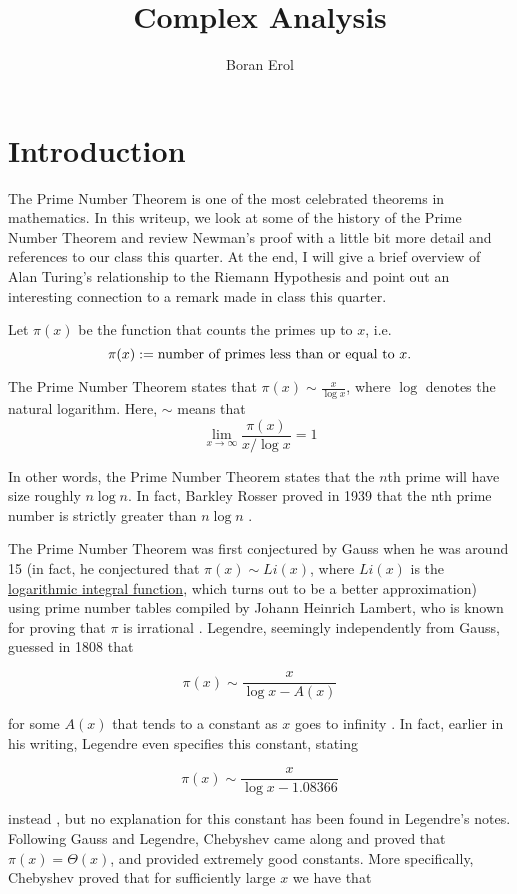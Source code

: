 \documentclass{article}
\title{Complex Analysis}
\author{Boran Erol}
\theoremstyle{definition}
\begin{document}
\maketitle

\section{Introduction}

The Prime Number Theorem is one of the most celebrated theorems in mathematics. In this writeup,
we look at some of the history of the Prime Number Theorem and review Newman's proof with a little bit 
more detail and references to our class this quarter. At the end,
I will give a brief overview of Alan Turing's relationship to the Riemann Hypothesis
and point out an interesting connection to a remark made in class this quarter.

Let $ \pi(x) $ be the function that counts the primes up to $ x $, i.e.\[ \pi(x) := \text{number of primes less than or equal to $ x $} .\]

The Prime Number Theorem states that $ \pi(x) \sim \frac{x}{\log x} $, where $\log $ denotes the natural logarithm.
Here, $ \sim $ means that \[ \lim_{x \to \infty} \frac{ \pi(x)}{x/ \log{x}} = 1 \]

In other words, the Prime Number Theorem states that the $n$th prime will have size roughly $ n \log n $.
In fact, Barkley Rosser proved in 1939 that the nth prime number is strictly greater than $ n \log n $ \cite{rosser_n-th_1939}.

The Prime Number Theorem was first conjectured by Gauss when he was around 15 (in fact, 
he conjectured that $ \pi(x) \sim Li(x) $, where $ Li(x) $ is the \href{https://en.wikipedia.org/wiki/Logarithmic_integral_function}{logarithmic integral function}, which turns out to be a better approximation) 
using prime number tables compiled by Johann Heinrich Lambert, who is
known for proving that $ \pi $ is irrational \cite{klyve_origin_2018} \cite{noauthor_histoire_nodate}. Legendre, seemingly independently from Gauss,
guessed in 1808 that

\[ \pi(x) \sim \frac{x}{\log x - A(x)} \]

for some $ A(x) $ that tends to a constant as $ x $ goes to infinity \cite{bateman_hundred_1996}. In fact,
earlier in his writing, Legendre even specifies this constant, stating 

\[ \pi(x) \sim \frac{x}{\log x - 1.08366} \]

instead \cite{bambah_centennial_2000}, but no explanation for this constant has been found in Legendre's notes.
Following Gauss and Legendre, Chebyshev came along and proved that $ \pi(x) = \Theta(x) $,
and provided extremely good constants. More specifically, Chebyshev \cite{bateman_hundred_1996} proved that for 
sufficiently large $ x $ we have that
\end{document}
